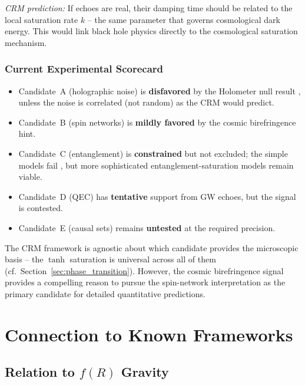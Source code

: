 \documentclass[aps,prd,twocolumn,superscriptaddress,nofootinbib]{revtex4-2}
\begin{document}
\textit{CRM prediction:} If echoes are real, their damping time should be related to the local saturation rate $k$ -- the same parameter that governs cosmological dark energy. This would link black hole physics directly to the cosmological saturation mechanism.

\subsubsection{Current Experimental Scorecard}

\begin{itemize}
\item Candidate~A (holographic noise) is \textbf{disfavored} by the Holometer null result \cite{Chou2017}, unless the noise is correlated (not random) as the CRM would predict.
\item Candidate~B (spin networks) is \textbf{mildly favored} by the cosmic birefringence hint.
\item Candidate~C (entanglement) is \textbf{constrained} but not excluded; the simple models fail \cite{Donadi2021}, but more sophisticated entanglement-saturation models remain viable.
\item Candidate~D (QEC) has \textbf{tentative} support from GW echoes, but the signal is contested.
\item Candidate~E (causal sets) remains \textbf{untested} at the required precision.
\end{itemize}

The CRM framework is agnostic about which candidate provides the microscopic basis -- the $\tanh$ saturation is universal across all of them (cf.\ Section~\ref{sec:phase_transition}). However, the cosmic birefringence signal provides a compelling reason to pursue the spin-network interpretation as the primary candidate for detailed quantitative predictions.


\section{Connection to Known Frameworks}
\label{sec:connections}

\subsection{Relation to $f(R)$ Gravity}
\end{document}
